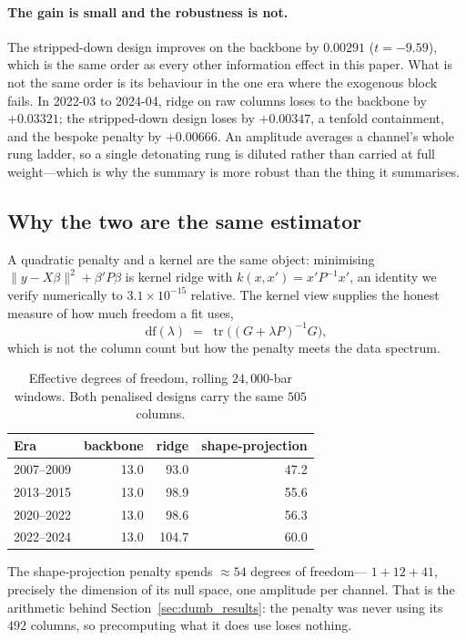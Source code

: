 \paragraph{The gain is small and the robustness is not.} The stripped-down
design improves on the backbone by $0.00291$ ($t = -9.59$), which is the same
order as every other information effect in this paper. What is not the same
order is its behaviour in the one era where the exogenous block fails. In
2022-03 to 2024-04, ridge on raw columns loses to the backbone by $+0.03321$;
the stripped-down design loses by $+0.00347$, a tenfold containment, and the
bespoke penalty by $+0.00666$. An amplitude averages a channel's whole rung
ladder, so a single detonating rung is diluted rather than carried at full
weight---which is why the summary is more robust than the thing it summarises.

\subsection{Why the two are the same estimator}
\label{sec:effective_df}

A quadratic penalty and a kernel are the same object: minimising
$\lVert y - X\beta \rVert^2 + \beta' P \beta$ is kernel ridge with
$k(x, x') = x' P^{-1} x'$, an identity we verify numerically to $3.1 \times
10^{-15}$ relative. The kernel view supplies the honest measure of how much
freedom a fit uses,
\[
  \mathrm{df}(\lambda) \;=\; \operatorname{tr}\!\big( (G + \lambda P)^{-1} G \big),
\]
which is not the column count but how the penalty meets the data spectrum.

\begin{table}[H]
\centering
\caption{Effective degrees of freedom, rolling $24{,}000$-bar windows. Both
penalised designs carry the same $505$ columns.}
\label{tab:df}
\begin{tabular}{lrrr}
\toprule
Era & backbone & ridge & shape-projection \\
\midrule
2007--2009 & 13.0 & 93.0 & 47.2 \\
2013--2015 & 13.0 & 98.9 & 55.6 \\
2020--2022 & 13.0 & 98.6 & 56.3 \\
2022--2024 & 13.0 & 104.7 & 60.0 \\
\bottomrule
\end{tabular}
\end{table}

The shape-projection penalty spends $\approx 54$ degrees of freedom---
$1 + 12 + 41$, precisely the dimension of its null space, one amplitude per
channel. That is the arithmetic behind Section~\ref{sec:dumb_results}: the
penalty was never using its $492$ columns, so precomputing what it does use
loses nothing.

